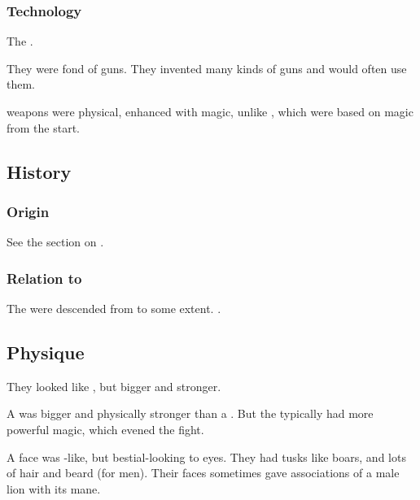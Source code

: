 \subsubsection{Technology}
The \aryothim {}. 

They were fond of guns. 
They invented many kinds of guns and would often use them. 

\Aryoth{} weapons were physical, enhanced with magic, unlike , which were based on magic from the start. 









\subsection{History}





\subsubsection{Origin}
See the section on . 



\subsubsection{Relation to \resphain}
The \resphain were descended from \aryothim to some extent. 
.









\subsection{Physique}
They looked like \nephilim, but bigger and stronger. 

A \aryoth{} was bigger and physically stronger than a \quiljaar. 
But the \quiljaaran{} typically had more powerful magic, which evened the fight. 

A \aryoth{} face was \human-like, but bestial-looking to \human{} eyes. 
They had tusks like boars, and lots of hair and beard (for men). 
Their faces sometimes gave associations of a male lion with its mane. 

